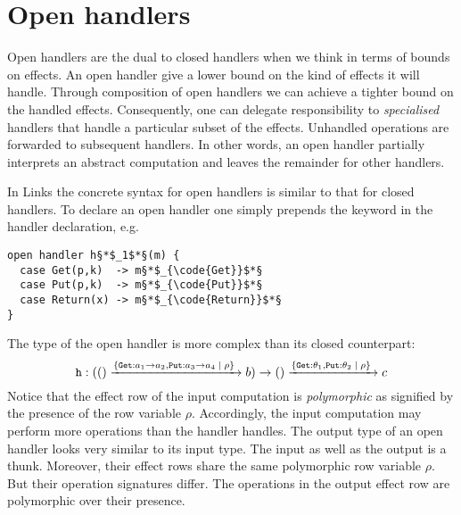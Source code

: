 \section{Open handlers}\label{sec:openhandlers}
Open handlers are the dual to closed handlers when we think in terms of bounds on effects. An open handler give a lower bound on the kind of effects it will handle. Through composition of open handlers we can achieve a tighter bound on the handled effects. Consequently, one can delegate responsibility to \emph{specialised} handlers that handle a particular subset of the effects. Unhandled operations are forwarded to subsequent handlers. In other words, an open handler partially interprets an abstract computation and leaves the remainder for other handlers.

In Links the concrete syntax for open handlers is similar to that for closed handlers. To declare an open handler one simply prepends the keyword  in the handler declaration, e.g.
\begin{lstlisting}[style=links]
open handler h§*$_1$*§(m) {
  case Get(p,k)  -> m§*$_{\code{Get}}$*§
  case Put(p,k)  -> m§*$_{\code{Put}}$*§
  case Return(x) -> m§*$_{\code{Return}}$*§
}
\end{lstlisting}
The type of the open handler  is more complex than its closed counterpart:
\[ \texttt{h} : (() \xrightarrow{ \{ \texttt{Get}: a_1 \to a_2, \texttt{Put}: a_3 \to a_4 \; | \; \rho\}\; } b) \to () \xrightarrow{ \{ \texttt{Get}: \theta_1, \texttt{Put}: \theta_2 \; | \; \rho\}\;} c \]
Notice that the effect row of the input computation is \emph{polymorphic} as signified by the presence of the row variable $\rho$. Accordingly, the input computation may perform more operations than the handler handles. The output type of an open handler looks very similar to its input type. The input as well as the output is a thunk. Moreover, their effect rows share the same polymorphic row variable $\rho$. But their operation signatures differ. The operations in the output effect row are polymorphic over their presence.

